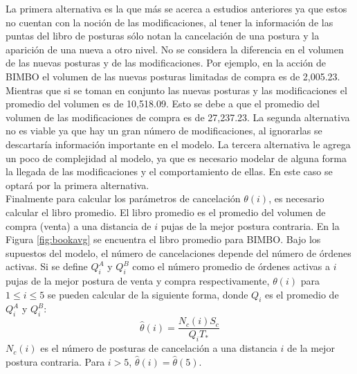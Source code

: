 \documentclass[11pt]{article}
\numberwithin{equation}{section} %
\begin{document}
La primera alternativa es la que más se acerca a estudios anteriores ya que estos no cuentan con la noción de las modificaciones, al tener la información de las puntas del libro de posturas sólo notan la cancelación de una postura y la aparición de una nueva a otro nivel. No se considera la diferencia en el volumen de las nuevas posturas y de las modificaciones. Por ejemplo, en la acción de BIMBO el volumen de las nuevas posturas limitadas de compra es de 2,005.23. Mientras que si se toman en conjunto las nuevas posturas y las modificaciones el promedio del volumen es de 10,518.09. Esto se debe a que el promedio del volumen de las modificaciones de compra es de 27,237.23. La segunda alternativa no es viable ya que hay un gran número de modificaciones, al ignorarlas se descartaría información importante en el modelo. La tercera alternativa le agrega un poco de complejidad al modelo, ya que es necesario modelar de alguna forma la llegada de las modificaciones y el comportamiento de ellas. En este caso se optará por la primera alternativa.\\

Finalmente para calcular los parámetros de cancelación $\theta(i)$, es necesario calcular el libro promedio. El libro promedio es el promedio del volumen de compra (venta) a una distancia de $i$ pujas de la mejor postura contraria. En la Figura \ref{fig:bookavg} se encuentra el libro promedio para BIMBO. Bajo los supuestos del modelo, el número de cancelaciones depende del número de órdenes activas. Si se define $Q_i^A$ y $Q_i^B$ como el número promedio de órdenes activas a $i$ pujas de la mejor postura de venta y compra respectivamente,  $\theta(i)$ para $1\leq i \leq 5$ se pueden calcular de la siguiente forma, donde $Q_i$ es el promedio de $Q_i^A$ y $Q_i^B$:
\[
\hat{\theta}(i)=\frac{N_c(i) S_c}{Q_i T_*}
\]
$N_c(i)$ es el número de posturas de cancelación a una distancia $i$ de la mejor postura contraria. Para $i>5$, $\hat{\theta}(i)=\hat{\theta}(5)$.\\
\end{document}
